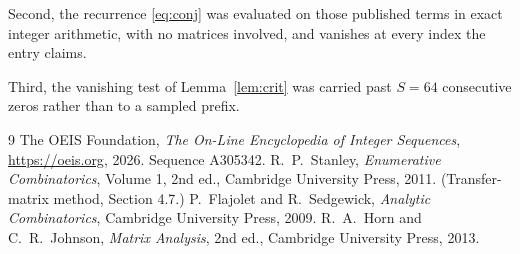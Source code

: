 \documentclass[11pt,a4paper]{article}
\theoremstyle{plain}
\theoremstyle{definition}
\begin{document}
Second, the recurrence \eqref{eq:conj} was evaluated on those published terms in exact
integer arithmetic, with no matrices involved, and vanishes at every index the entry claims.

Third, the vanishing test of Lemma~\ref{lem:crit} was carried past $S=64$ consecutive
zeros rather than to a sampled prefix.

\begin{thebibliography}{9}
 The OEIS Foundation, \emph{The On-Line Encyclopedia of Integer
Sequences}, \url{https://oeis.org}, 2026. Sequence A305342.
 R.~P.~Stanley, \emph{Enumerative Combinatorics}, Volume 1, 2nd ed.,
Cambridge University Press, 2011. (Transfer-matrix method, Section 4.7.)
 P.~Flajolet and R.~Sedgewick, \emph{Analytic Combinatorics}, Cambridge
University Press, 2009.
 R.~A.~Horn and C.~R.~Johnson, \emph{Matrix Analysis}, 2nd ed., Cambridge
University Press, 2013.
\end{thebibliography}
\end{document}

